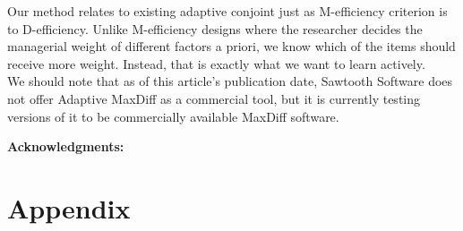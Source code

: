 \documentclass[a4paper,12pt]{article}
\begin{document}
Our method relates to existing adaptive conjoint just as M-efficiency criterion is to D-efficiency.  Unlike M-efficiency designs where the researcher decides the managerial weight of different factors a priori, we know which of the items should receive more weight. Instead, that is exactly what we want to learn actively. \\
We should note that as of this article's publication date, Sawtooth Software does not offer Adaptive MaxDiff as a commercial tool, but it is currently testing versions of it to be commercially available MaxDiff software. 









\textbf{Acknowledgments:}
{%
}%


%
%
%




\newpage

\section*{Appendix} 
\end{document}

